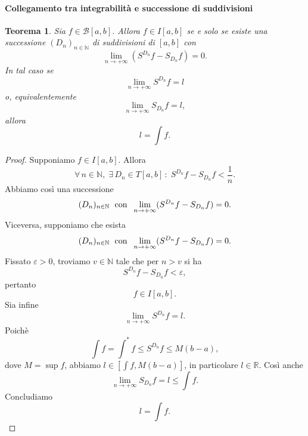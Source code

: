 \documentclass{article}
\theoremstyle{plain}
\newtheorem{thm}{Teorema}[section]
\theoremstyle{definition}
\theoremstyle{remark}
\begin{document}
\paragraph{Collegamento tra integrabilità e successione di suddivisioni}
\begin{bxthm}
\begin{thm}
    Sia $f\in \mathcal{B}[a,b]$. Allora $f\in I[a,b]$ se e solo se esiste una successione $(D_n)_{n\in\mathbb{N}}$ di suddivisioni di $[a,b]$
    con \[\lim_{n\to+\infty}(S^{D_n}f-S_{D_n}f)=0.\]
    In tal caso se \[\lim_{n\to+\infty}S^{D_n}f=l\] o, equivalentemente \[\lim_{n\to+\infty}S_{D_n}f=l,\]
    allora \[l=\int f.\]
\end{thm}
\end{bxthm}
\begin{proof}
    Supponiamo $f\in I[a,b]$. 
    Allora 
    \[\forall\,n\in\mathbb{N},\;\exists\,D_n\in T[a,b]\,:\;S^{D_n}f-S_{D_n}f<\dfrac{1}{n}.\]
    Abbiamo così una successione
    \[(D_n)_{n\in\mathbb{N}}\;\textup{ con }\;\lim_{n\to+\infty}(S^{D_n}f-S_{D_n}f)=0.\]
    Viceversa, supponiamo che esista 
    \[(D_n)_{n\in\mathbb{N}}\;\textup{ con }\;\lim_{n\to+\infty}(S^{D_n}f-S_{D_n}f)=0. \]
    Fissato $\varepsilon>0$, troviamo $v\in\mathbb{N}$ tale che per $n>v$ si ha 
    \[S^{D_n}f-S_{D_n}f<\varepsilon, \]
    pertanto \[f\in I[a,b].\]
    Sia infine 
    \[\lim_{n\to+\infty}S^{D_n}f=l.\]
    Poichè 
    \[\int f=\int^*f\leq S^{D_n}f\leq M(b-a),\]
    dove $M=\sup f$, abbiamo $l\in [\int f, M(b-a)]$, in particolare $l\in\mathbb{R}$. 
    Così anche 
    \[\lim_{n\to+\infty}S_{D_n}f=l\leq\int f.\]
    Concludiamo 
    \[l=\int f.\]
\end{proof}

\vspace{10pt}
\end{document}
